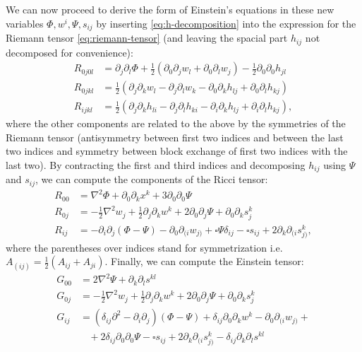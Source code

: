 \documentclass[a4paper]{article}
\begin{document}
We can now proceed to derive the form of Einstein's equations in these new variables $\Phi, w^i, \Psi, s_{ij}$ by inserting \eqref{eq:h-decomposition} into the expression for the Riemann tensor \eqref{eq:riemann-tensor} (and leaving the spacial part $h_{ij}$ not decomposed for convenience):
\begin{subequations}
  \begin{align}
    R_{0j0l} &= \partial_j\partial_l\Phi + \frac{1}{2}(\partial_0\partial_j w_l + \partial_0\partial_l w_j) - \frac{1}{2}\partial_0 \partial_0 h_{jl}\\
    R_{0jkl} &= \frac{1}{2}\left(\partial_j\partial_k w_l - \partial_j\partial_l w_k - \partial_0 \partial_k h_{lj} + \partial_0 \partial_l h_{kj}\right)\\
    R_{ijkl} &= \frac{1}{2}\left(\partial_j \partial_k h_{li} - \partial_j \partial_l h_{ki} -\partial_i \partial_k h_{lj} + \partial_i \partial_l h_{kj}\right),
  \end{align}
\end{subequations}
where the other components are related to the above by the symmetries of the Riemann tensor (antisymmetry between first two indices and between the last two indices and symmetry between block exchange of first two indices with the last two). By contracting the first and third indices and decomposing $h_{ij}$ using $\Psi$ and $s_{ij}$, we can compute the components of the Ricci tensor:
\begin{subequations}
\begin{align}
R_{00} &= \nabla^2\Phi + \partial_0\partial_k x^k + 3\partial_0\partial_0\Psi\\
R_{0j} &= -\frac{1}{2}\nabla^2 w_j + \frac{1}{2} \partial_j \partial_k w^k + 2\partial_0\partial_j \Psi + \partial_0\partial_k s_j^k\\
R_{ij} &= -\partial_i\partial_j(\Phi - \Psi) - \partial_0 \partial_{(i}w_{j)} + \square\Psi\delta_{ij} - \square s_{ij} + 2\partial_k\partial_{(i}s_{j)}^k,
\end{align}
\end{subequations}
where the parentheses over indices stand for symmetrization i.e. $A_{(ij)} = \frac{1}{2}(A_{ij} + A_{ji})$.
Finally, we can compute the Einstein tensor:
\begin{subequations}
  \begin{align}
    G_{00} &= 2\nabla^2 \Psi + \partial_k \partial_l s^{kl}\\
    G_{0j} &= -\frac{1}{2}\nabla^2 w_j + \frac{1}{2}\partial_j\partial_k w^k + 2\partial_0\partial_j \Psi + \partial_0 \partial_k s_j^k\\
    G_{ij} &= (\delta_{ij}\partial^2 - \partial_i\partial_j)(\Phi - \Psi) + \delta_{ij}\partial_0 \partial_k w^k - \partial_0 \partial_{(i}w_{j)} +\nonumber\\
    &\ \ \ \ + 2\delta_{ij}\partial_0\partial_0\Psi - \square s_{ij} + 2\partial_k \partial_{(i}s_{j)}^k - \delta_{ij} \partial_{k}\partial_l s^{kl}
  \end{align}
\end{subequations}
\end{document}
